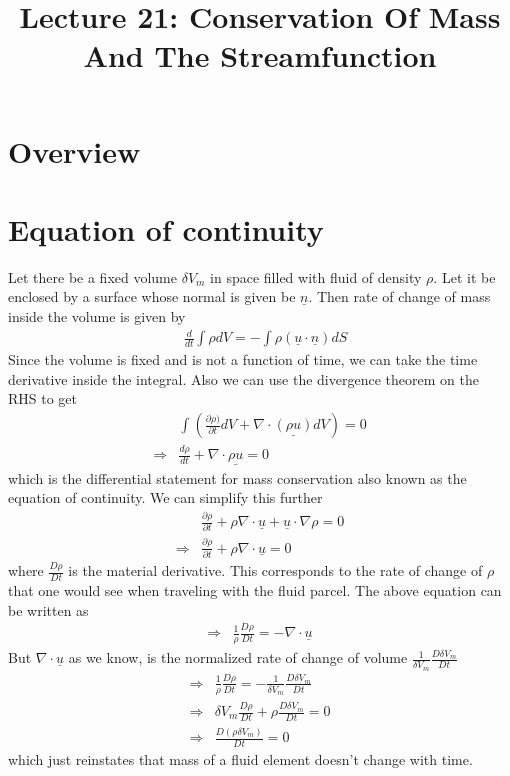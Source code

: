 \documentclass[11pt,a4paper]{article}
\title{Lecture 21: Conservation Of Mass And The Streamfunction}
\date{\displaydate{date}}
\author{}
\newcommand{\dl}{\delta}
\newcommand{\pd}[2]{\frac{\partial #1}{\partial #2}}
\newcommand{\vect}[1]{\underline{#1}}
\newcommand{\1}{\vect{1}}
\newcommand{\grad}{\nabla}
\newcommand{\RA}{\Rightarrow}
\newcommand{\dotp}[2]{\vect{#1}\cdot\vect{#2}}
\newcommand{\divg}[1]{\grad\cdot\vect{#1}}
\begin{document}
\maketitle

\section*{Overview}

\section{Equation of continuity}

Let there be a fixed volume $\dl V_m$ in space filled with fluid of density $\rho$. Let it be enclosed by a surface whose normal is given be $\vect n$. Then rate of change of mass inside the volume is given by
\begin{align*}
&\frac{d}{dt}\int \rho dV = -\int \rho (\dotp u n)dS
\end{align*}
Since the volume is fixed and is not a function of time, we can take the time derivative inside the integral. Also we can use the divergence theorem on the RHS to get
\begin{align*}
&\int (\frac{\partial\rho)}{\partial t}dV + \divg{(\rho u)} dV) = 0\\
\RA & \frac{d\rho}{dt} + \divg{\rho u} = 0
\end{align*}
which is the differential statement for mass conservation also known as the equation of continuity. We can simplify this further
\begin{align*}
& \pd{\rho}{t} + \rho \divg u + \vect u\cdot \grad\rho = 0\\
\RA& \pd{\rho}{t} + \rho \divg u = 0
\end{align*}
where $\frac{D\rho}{Dt}$ is the material derivative. This corresponds to the rate of change of $\rho$ that one would see when traveling with the fluid parcel. The above equation can be written as
\begin{align*}
\RA& \frac{1}{\rho}\frac{D\rho}{Dt} =- \divg u
\end{align*} 
But $\divg u$ as we know, is the normalized rate of change of volume $\frac{1}{\dl V_m}\frac{D\dl V_m}{Dt}$
\begin{align*}
\RA&\frac{1}{\rho}\frac{D\rho}{Dt} =- \frac{1}{\dl V_m}\frac{D\dl V_m}{Dt}\\
\RA&\dl V_m\frac{D\rho}{Dt} + \rho\frac{D\dl V_m}{Dt} = 0\\
\RA&\frac{D(\rho \dl V_m)}{Dt} = 0
\end{align*}
which just reinstates that mass of a fluid element doesn't change with time.
\end{document}
